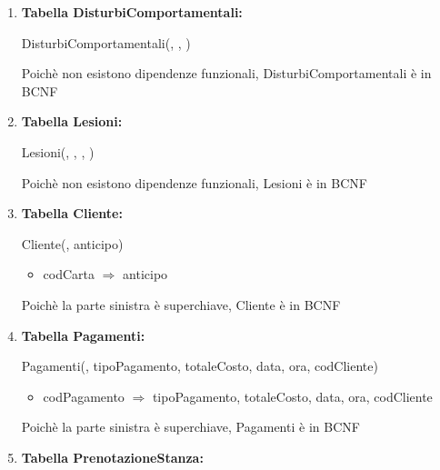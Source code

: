 \documentclass[12pt,a4paper]{article}
\begin{document}
\begin{enumerate}
\item[] \textbf{Tabella DisturbiComportamentali:}

DisturbiComportamentali(\underline{}, \underline{}, \underline{})

Poichè non esistono dipendenze funzionali, DisturbiComportamentali è in BCNF
\vspace{10pt}



\item[] \textbf{Tabella Lesioni:}

Lesioni(\underline{}, \underline{}, \underline{}, \underline{})

Poichè non esistono dipendenze funzionali, Lesioni è in BCNF
\vspace{10pt}



\item[] \textbf{Tabella Cliente:}

Cliente(\underline{}, anticipo)
\begin{itemize}
\vspace{-5pt}
\item codCarta $\Rightarrow$ anticipo
\vspace{-5pt}
\end{itemize}
Poichè la parte sinistra è superchiave, Cliente è in BCNF
\vspace{10pt}



\item[] \textbf{Tabella Pagamenti:}

Pagamenti(\underline{}, tipoPagamento, totaleCosto, data, ora,  codCliente)
\begin{itemize}
\vspace{-5pt}
\item codPagamento $\Rightarrow$ tipoPagamento, totaleCosto, data, ora, codCliente
\vspace{-5pt}
\end{itemize}
Poichè la parte sinistra è superchiave, Pagamenti è in BCNF
\vspace{10pt}



\item[] \textbf{Tabella PrenotazioneStanza:}


\end{enumerate}
\end{document}

